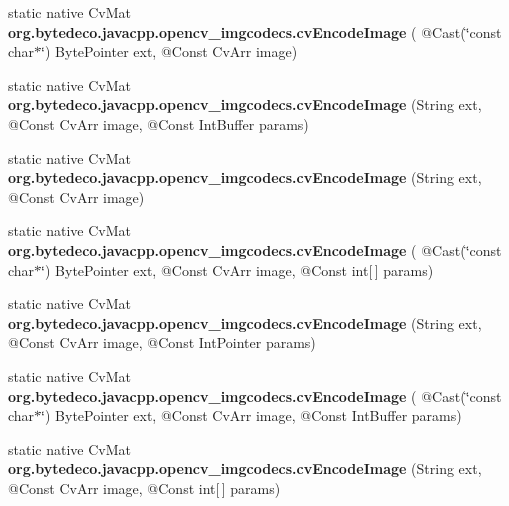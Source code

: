 \begin{DoxyCompactItemize}
\item 
\mbox{\label{group__imgcodecs__c_ga541a0e91333d63e4176072ad57d99d0e}} 
static native Cv\+Mat {\bfseries org.\+bytedeco.\+javacpp.\+opencv\+\_\+imgcodecs.\+cv\+Encode\+Image} ( @Cast(\char`\"{}const char$\ast$\char`\"{}) Byte\+Pointer ext, @Const Cv\+Arr image)
\item 
\mbox{\label{group__imgcodecs__c_ga9f15ae2564240ee0b4722661f0ad36a5}} 
static native Cv\+Mat {\bfseries org.\+bytedeco.\+javacpp.\+opencv\+\_\+imgcodecs.\+cv\+Encode\+Image} (String ext, @Const Cv\+Arr image, @Const Int\+Buffer params)
\item 
\mbox{\label{group__imgcodecs__c_ga034bd5ccd8485e389f800bbe54154174}} 
static native Cv\+Mat {\bfseries org.\+bytedeco.\+javacpp.\+opencv\+\_\+imgcodecs.\+cv\+Encode\+Image} (String ext, @Const Cv\+Arr image)
\item 
\mbox{\label{group__imgcodecs__c_ga61119afab837c8f437ec3cf6a464a42b}} 
static native Cv\+Mat {\bfseries org.\+bytedeco.\+javacpp.\+opencv\+\_\+imgcodecs.\+cv\+Encode\+Image} ( @Cast(\char`\"{}const char$\ast$\char`\"{}) Byte\+Pointer ext, @Const Cv\+Arr image, @Const int\mbox{[}$\,$\mbox{]} params)
\item 
\mbox{\label{group__imgcodecs__c_gac338f815ba5f4f261a71d766c76f183d}} 
static native Cv\+Mat {\bfseries org.\+bytedeco.\+javacpp.\+opencv\+\_\+imgcodecs.\+cv\+Encode\+Image} (String ext, @Const Cv\+Arr image, @Const Int\+Pointer params)
\item 
\mbox{\label{group__imgcodecs__c_gafc1ae54f6fbebcfc8b6ad568ad3dd518}} 
static native Cv\+Mat {\bfseries org.\+bytedeco.\+javacpp.\+opencv\+\_\+imgcodecs.\+cv\+Encode\+Image} ( @Cast(\char`\"{}const char$\ast$\char`\"{}) Byte\+Pointer ext, @Const Cv\+Arr image, @Const Int\+Buffer params)
\item 
\mbox{\label{group__imgcodecs__c_ga362dd8d8ce02f37e9dab228af0d8c0a4}} 
static native Cv\+Mat {\bfseries org.\+bytedeco.\+javacpp.\+opencv\+\_\+imgcodecs.\+cv\+Encode\+Image} (String ext, @Const Cv\+Arr image, @Const int\mbox{[}$\,$\mbox{]} params)
\item 

\end{DoxyCompactItemize}

